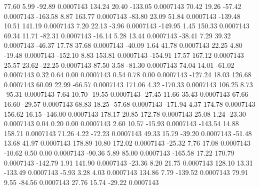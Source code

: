        77.60        5.99      -92.89     0.0007143
      134.24       20.40     -133.05     0.0007143
       70.42       19.26      -57.42     0.0007143
     -163.58        8.87      163.77     0.0007143
      -83.80       23.09       51.84     0.0007143
     -139.48       10.51      141.19     0.0007143
        7.20       22.13       -3.96     0.0007143
     -149.95        1.45      150.33     0.0007143
       69.34       11.71      -82.31     0.0007143
      -16.14        5.28       13.44     0.0007143
      -38.41        7.29       39.32     0.0007143
      -46.37       17.78       37.68     0.0007143
      -40.09        1.64       41.78     0.0007143
       22.25        4.80      -19.48     0.0007143
     -152.10        8.83      153.81     0.0007143
     -154.91       17.57      167.12     0.0007143
       25.57       23.62      -22.25     0.0007143
       87.50        3.58      -81.30     0.0007143
       74.04       14.01      -61.02     0.0007143
        0.32        0.64        0.00     0.0007143
        0.54        0.78        0.00     0.0007143
     -127.24       18.03      126.68     0.0007143
       60.09       22.99      -66.57     0.0007143
      171.06        4.32     -170.33     0.0007143
      106.25        8.73      -95.31     0.0007143
        7.64       10.70      -19.55     0.0007143
      -27.45       11.66       35.43     0.0007143
       67.66       16.60      -29.57     0.0007143
       68.83       18.25      -57.68     0.0007143
     -171.94        4.37      174.78     0.0007143
      156.62       16.15     -146.00     0.0007143
      178.17       20.85      172.78     0.0007143
       25.08        1.24      -23.30     0.0007143
        0.04        0.20        0.00     0.0007143
        2.60       10.57      -15.93     0.0007143
     -143.54       14.88      158.71     0.0007143
       71.26        4.22      -72.23     0.0007143
       49.33       15.79      -39.20     0.0007143
      -51.48       13.68       41.97     0.0007143
      178.89       10.80      172.02     0.0007143
      -25.32        7.76       17.08     0.0007143
      -10.62        0.50        0.00     0.0007143
      -90.36        5.89       85.00     0.0007143
     -165.58       17.22      170.79     0.0007143
     -142.79        1.91      141.90     0.0007143
      -23.36        8.20       21.75     0.0007143
      128.10       13.31     -133.49     0.0007143
       -5.93        3.28        4.03     0.0007143
      134.86        7.79     -139.52     0.0007143
       79.91        9.55      -84.56     0.0007143
       27.76       15.74      -29.22     0.0007143
